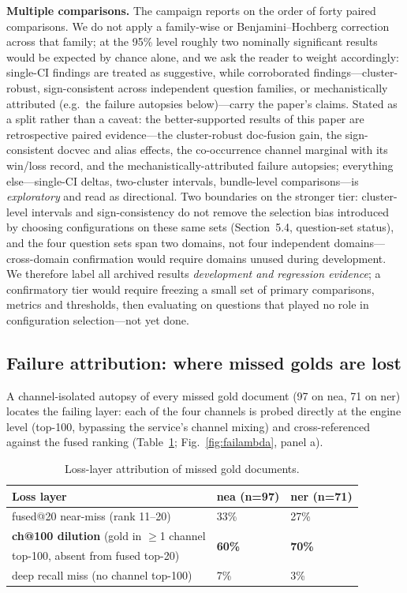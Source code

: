 \documentclass[sigconf,nonacm]{acmart}
\begin{document}
\textbf{Multiple comparisons.} The campaign reports on the order of forty
paired comparisons. We do not apply a family-wise or Benjamini--Hochberg
correction across that family; at the 95\% level roughly two nominally
significant results would be expected by chance alone, and we ask the
reader to weight accordingly: single-CI findings are treated as
suggestive, while corroborated findings---cluster-robust, sign-consistent
across independent question families, or mechanistically attributed
(e.g.\ the failure autopsies below)---carry the paper's claims. Stated as
a split rather than a caveat: the better-supported results of this paper
are retrospective paired evidence---the cluster-robust doc-fusion gain,
the sign-consistent docvec and alias effects, the co-occurrence
channel marginal with its win/loss record, and the
mechanistically-attributed failure autopsies; everything
else---single-CI deltas, two-cluster intervals, bundle-level
comparisons---is \emph{exploratory} and read as directional. Two
boundaries on the stronger tier: cluster-level intervals and
sign-consistency do not remove the selection bias introduced by
choosing configurations on these same sets (Section~5.4, question-set
status), and the four question sets span two domains, not four
independent domains---cross-domain confirmation would require domains
unused during development. We therefore label all archived results
\emph{development and regression evidence}; a confirmatory tier would
require freezing a small set of primary comparisons, metrics and
thresholds, then evaluating on questions that played no role in
configuration selection---not yet done.

\subsection{Failure attribution: where missed golds are lost}
\label{sec:autopsy}

A channel-isolated autopsy of every missed gold document (97 on nea, 71 on
ner) locates the failing layer: each of the four channels is probed directly
at the engine level (top-100, bypassing the service's channel mixing) and
cross-referenced against the fused ranking (Table~\ref{tab:loss};
Fig.~\ref{fig:failambda}, panel a).

\begin{table}[!t]
\centering
\caption{Loss-layer attribution of missed gold documents.}
\label{tab:loss}
\begin{tabular}{lll}
\toprule
Loss layer & nea (n=97) & ner (n=71) \\
\midrule
fused@20 near-miss (rank 11--20) & 33\% & 27\% \\
\textbf{ch@100 dilution} (gold in $\geq$1 channel & \multirow{2}{*}{\textbf{60\%}} & \multirow{2}{*}{\textbf{70\%}} \\
top-100, absent from fused top-20) & & \\
deep recall miss (no channel top-100) & 7\% & 3\% \\
\bottomrule
\end{tabular}
\end{table}
\end{document}
